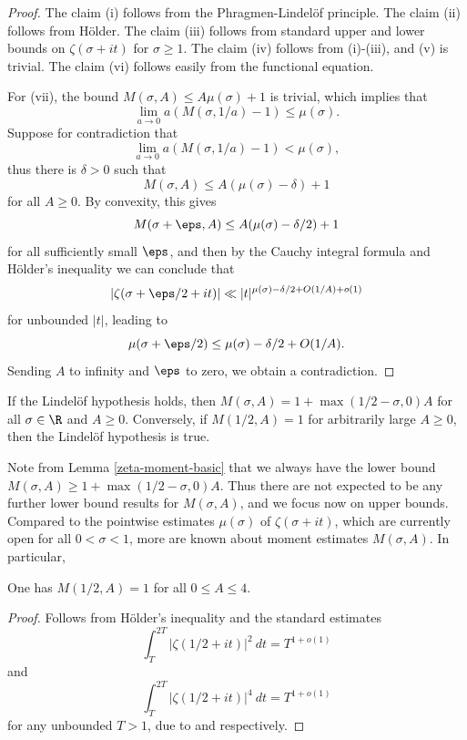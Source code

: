\begin{proof} The claim (i) follows from the Phragmen-Lindel\"of principle.  The claim (ii) follows from H\"older.  The claim (iii) follows from standard upper and lower bounds on $\zeta(\sigma+it)$ for $\sigma \geq 1$. The claim (iv) follows from (i)-(iii), and (v) is trivial. The claim (vi) follows easily from the functional equation.

For (vii), the bound $M(\sigma,A) \leq A \mu(\sigma) + 1$ is trivial, which implies that
$$ \lim_{a \to 0} a(M(\sigma,1/a)-1) \leq \mu(\sigma).$$
Suppose for contradiction that
$$ \lim_{a \to 0} a(M(\sigma,1/a)-1) < \mu(\sigma),$$
thus there is $\delta>0$ such that
$$M(\sigma,A) \leq A (\mu(\sigma)-\delta) + 1$$
for all $A\geq 0$.  By convexity, this gives
$$M(\sigma+\eps,A) \leq A (\mu(\sigma)-\delta/2) + 1$$
for all sufficiently small $\eps$, and then by the Cauchy integral formula and H\"older's inequality we can conclude that
$$ |\zeta(\sigma+\eps/2 +it)| \ll |t|^{\mu(\sigma)-\delta/2 + O(1/A) + o(1)} $$
for unbounded $|t|$, leading to
$$ \mu(\sigma+\eps/2) \leq \mu(\sigma)-\delta/2 + O(1/A).$$
Sending $A$ to infinity and $\eps$ to zero, we obtain a contradiction.
\end{proof}

\begin{corollary}\label{moment_from_lindelof} If the Lindel\"of hypothesis holds, then $M(\sigma,A) = 1 + \max(1/2-\sigma,0) A$ for all $\sigma \in \R$ and $A \geq 0$. Conversely, if $M(1/2, A) = 1$ for arbitrarily large $A \ge 0$, then the Lindel\"of hypothesis is true. 
\end{corollary}

Note from Lemma \ref{zeta-moment-basic} that we always have the lower bound $M(\sigma,A) \geq 1 + \max(1/2-\sigma,0) A$.  Thus there are not expected to be any further lower bound results for $M(\sigma,A)$, and we focus now on upper bounds. Compared to the pointwise estimates $\mu(\sigma)$ of $\zeta(\sigma + it)$, which are currently open for all $0 < \sigma < 1$, more are known about moment estimates $M(\sigma, A)$. In particular, 

\begin{lemma}\label{mad_known_est}One has $M(1/2,A)=1$ for all $0 \leq A \leq 4$.
\end{lemma}
\begin{proof}
Follows from H\"older's inequality and the standard estimates
$$ \int_T^{2T} |\zeta(1/2+it)|^2\ dt = T^{1+o(1)}$$
and 
$$ \int_T^{2T} |\zeta(1/2+it)|^4\ dt = T^{1+o(1)}$$
for any unbounded $T>1$, due to \cite{hardy_contributions_1916} and \cite{hardy_littlewood_approximate_1923} respectively. 
\end{proof}

